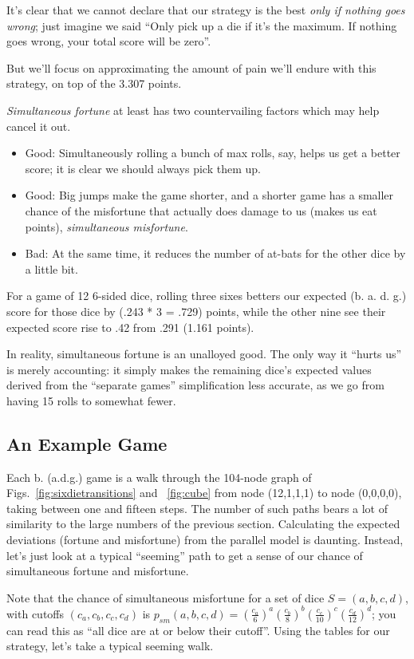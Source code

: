 \documentclass[11pt, oneside]{article} 	%
\begin{document}
It's clear that we cannot declare that our strategy is the best \emph{only if nothing goes wrong}; just imagine we said ``Only pick up a die if it's the maximum. If nothing goes wrong, your total score will be zero''.

But we'll focus on approximating the amount of pain we'll endure with this strategy, on top of the 3.307 points. 

\emph{Simultaneous fortune} at least has two countervailing factors which may help cancel it out. 
\begin{itemize}
\item Good: Simultaneously rolling a bunch of max rolls, say, helps us get a better score; it is clear we should always pick them up.
\item Good: Big jumps make the game shorter, and a shorter game has a smaller chance of the misfortune that actually does damage to us (makes us eat points), \emph{simultaneous misfortune}. 
\item Bad: At the same time, it reduces the number of at-bats for the other dice by a little bit.  
\end{itemize}

For a game of 12 6-sided dice, rolling three sixes betters our expected (b. a. d. g.) score for those dice by (.243 * 3 = .729) points, while the other nine see their expected score rise to .42 from .291 (1.161 points). 

In reality, simultaneous fortune is an unalloyed good. The only way it ``hurts us'' is merely accounting: it simply makes the remaining dice's expected values derived from  the ``separate games''  simplification less accurate, as we go from having 15 rolls to somewhat fewer. 

\subsection{An Example Game}

Each b. (a.d.g.) game is a walk through the 104-node graph of Figs.~\ref{fig:sixdietransitions} and ~\ref{fig:cube} from node (12,1,1,1) to node (0,0,0,0), taking between one and fifteen steps. The number of such paths bears a lot of similarity to the large numbers of the previous section. Calculating the expected deviations (fortune and misfortune) from the parallel model is daunting. Instead, let's just look at a typical ``seeming'' path to get a sense of our chance of simultaneous fortune and misfortune.

Note that the chance of simultaneous misfortune for a set of dice $S=(a,b,c,d)$, with cutoffs $(c_a, c_b, c_c, c_d)$ is $p_{sm}(a,b,c,d) = (\frac{c_a}{6})^a (\frac{c_b}{8})^b (\frac{c_c}{10})^c (\frac{c_d}{12})^d$; you can read this as ``all dice are at or below their cutoff''. Using the tables for our strategy, let's take a typical seeming walk.
\end{document}
